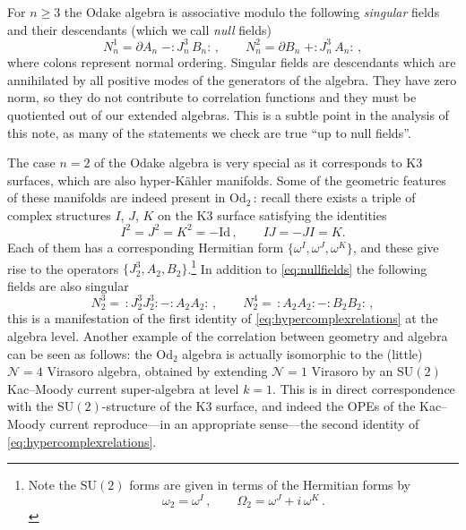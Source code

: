 \documentclass{pspum-l}
\newcommand{\normord}[1]{:\mathrel{#1}:} %
\theoremstyle{definition}
\theoremstyle{remark}
\numberwithin{equation}{section}
\begin{document}
For $n\geq 3$ the Odake algebra is associative modulo the following \emph{singular} fields and their descendants (which we call \emph{null} fields)
\begin{equation}
\label{eq:nullfields}
N^1_n = \partial A_n \; -\normord{J^3_n\, B_n} \, , \qquad
N^2_n = \partial B_n \; +\normord{J^3_n\, A_n} \, ,
\end{equation}
where colons represent normal ordering. Singular fields are descendants which are annihilated by all positive modes of the generators of the algebra. They have zero norm, so they do not contribute to correlation functions and they must be quotiented out of our extended algebras. This is a subtle point in the analysis of this note, as many of the statements we check are true ``up to null fields''.

The case $n=2$ of the Odake algebra is very special as it corresponds to K3 surfaces, which are also hyper-K\"ahler manifolds. Some of the geometric features of these manifolds are indeed present in $\text{Od}_2\,$: recall there exists a triple of complex structures $I$, $J$, $K$ on the K3 surface satisfying the identities
\begin{equation}
\label{eq:hypercomplexrelations}
I^2=J^2=K^2=-\text{Id}\,, \qquad I J=-J I=K.
\end{equation}
Each of them has a corresponding Hermitian form $\lbrace \omega^I,\omega^J,\omega^K \rbrace$, and these give rise to the operators $\lbrace J^3_2, A_2, B_2 \rbrace$.\footnote{Note the $\text{SU}(2)$ forms are given in terms of the Hermitian forms by
\begin{equation*}
    \omega_2=\omega^I\, , \qquad \Omega_2=\omega^J+i\,\omega^K \, .
\end{equation*}
} In addition to \eqref{eq:nullfields} the following fields are also singular
\begin{equation}
    N^3_2=\,\normord{J^3_2 J^3_2} - \normord{A_2 A_2} \, , \qquad N^4_2=\,\normord{A_2 A_2} - \normord{B_2 B_2} \, ,
\end{equation}
this is a manifestation of the first identity of \eqref{eq:hypercomplexrelations} at the algebra level. Another example of the correlation between geometry and algebra can be seen as follows: the $\text{Od}_2$ algebra is actually isomorphic to the (little) $\mathcal{N}=4$ Virasoro algebra, obtained by extending $\mathcal{N}=1$ Virasoro by an $\text{SU}(2)$ Kac--Moody current super-algebra at level $k=1$. This is in direct correspondence with the $\text{SU}(2)$-structure of the K3 surface, and indeed the OPEs of the Kac--Moody current reproduce---in an appropriate sense---the second identity of \eqref{eq:hypercomplexrelations}.
\end{document}
